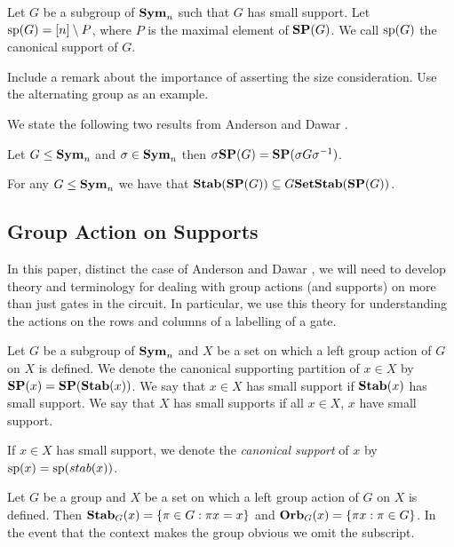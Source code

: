 \documentclass[../paper.tex]{subfiles}
\begin{document}
\begin{definition}
  Let $G$ be a subgroup of $\text{\textbf{Sym}}_n$ such that $G$ has small support. Let
  $\text{sp}(G) = [n] \setminus P$, where $P$ is the maximal element of $\text{\textbf{SP}}(G)$.
  We call $\text{sp}(G)$ the canonical support of $G$.
\end{definition}

\begin{remark}
  Include a remark about the importance of asserting the size consideration. Use
  the alternating group as an example.
\end{remark}

We state the following two results from Anderson and Dawar \cite{AndersonD17}.

\begin{lem}
  \label{lem:SP_conjugation}
  Let $G \leq \text{\textbf{Sym}}_n$ and $\sigma \in \text{\textbf{Sym}}_n$ then $\sigma \text{\textbf{SP}} (G) = \text{\textbf{SP}}(\sigma
  G \sigma^{-1})$.
\end{lem}

\begin{lem}
  For any $G \leq \text{\textbf{Sym}}_n$ we have that $\text{\textbf{Stab}} (\text{\textbf{SP}} (G)) \subseteq G
  \text{\textbf{SetStab}}(\text{\textbf{SP}}(G))$.
\end{lem}

\subsection{Group Action on Supports}
In this paper, distinct the case of Anderson and Dawar \cite{AndersonD17}, we
will need to develop theory and terminology for dealing with group actions (and
supports) on more than just gates in the circuit. In particular, we use this
theory for understanding the actions on the rows and columns of a labelling of a
gate.

\begin{definition}
  Let $G$ be a subgroup of $\text{\textbf{Sym}}_n$ and $X$ be a set on which a left group
  action of $G$ on $X$ is defined. We denote the canonical supporting partition
  of $x\in X$ by $\text{\textbf{SP}} (x) = \text{\textbf{SP}} (\text{\textbf{Stab}}(x))$. We say that $x \in X$ has small
  support if $\text{\textbf{Stab}}(x)$ has small support. We say that $X$ has small supports if
  all $x \in X$, $x$ have small support.

  If $x \in X$ has small support, we denote the \emph{canonical support} of $x$
  by $\text{sp}(x) = \text{sp} (stab(x))$.
\end{definition}

\begin{definition}
  Let $G$ be a group and $X$ be a set on which a left group action of $G$ on $X$
  is defined. Then $\text{\textbf{Stab}}_G (x) = \{\pi \in G : \pi x = x\}$ and $\text{\textbf{Orb}}_G (x) =
  \{\pi x : \pi \in G\}$. In the event that the context makes the group obvious
  we omit the subscript.
\end{definition}
\end{document}
